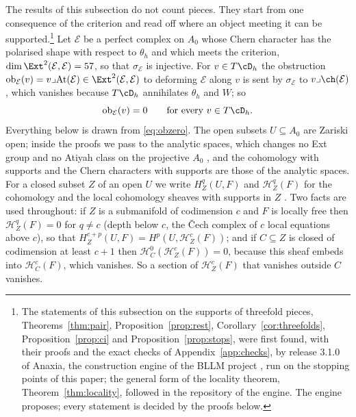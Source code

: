 The results of this subsection do not count pieces. They start from one consequence of the criterion and read off where an object meeting it can be supported.\footnote{The statements of this subsection on the supports of threefold pieces, Theorems~\ref{thm:pair}, Proposition~\ref{prop:rest}, Corollary~\ref{cor:threefolds}, Proposition~\ref{prop:ci} and Proposition~\ref{prop:stops}, were first found, with their proofs and the exact checks of Appendix~\ref{app:checks}, by release 3.1.0 of Anaxia, the construction engine of the BLLM project \cite{Bha26bllmb}, run on the stopping points of this paper; the general form of the locality theorem, Theorem~\ref{thm:locality}, followed in the repository of the engine. The engine proposes; every statement is decided by the proofs below.} Let $\mathcal{E}$ be a perfect complex on $A_{0}$ whose Chern character has the polarised shape with respect to $\theta_{h}$ and which meets the criterion, $\dim\Ext^{2}(\mathcal{E},\mathcal{E})=57$, so that $\sigma_{\mathcal{E}}$ is injective. For $v\in T\cD_{h}$ the obstruction $\mathrm{ob}_{\mathcal{E}}(v)=v\lrcorner\mathrm{At}(\mathcal{E})\in\Ext^{2}(\mathcal{E},\mathcal{E})$ to deforming $\mathcal{E}$ along $v$ is sent by $\sigma_{\mathcal{E}}$ to $v\lrcorner\ch(\mathcal{E})$ \cite{BF03}, which vanishes because $T\cD_{h}$ annihilates $\theta_{h}$ and $W$; so
\begin{equation}\label{eq:obzero}
\mathrm{ob}_{\mathcal{E}}(v)=0\qquad\text{for every }v\in T\cD_{h}.
\end{equation}
Everything below is drawn from \eqref{eq:obzero}. The open subsets $U\subseteq A_{0}$ are Zariski open; inside the proofs we pass to the analytic spaces, which changes no Ext group and no Atiyah class on the projective $A_{0}$ \cite{Ser56}, and the cohomology with supports and the Chern characters with supports are those of the analytic spaces. For a closed subset $Z$ of an open $U$ we write $H^{q}_{Z}(U,F)$ and $\mathcal{H}^{q}_{Z}(F)$ for the cohomology and the local cohomology sheaves with supports in $Z$ \cite{Har67}. Two facts are used throughout: if $Z$ is a submanifold of codimension $c$ and $F$ is locally free then $\mathcal{H}^{q}_{Z}(F)=0$ for $q\ne c$ (depth below $c$, the \v{C}ech complex of $c$ local equations above $c$), so that $H^{c+p}_{Z}(U,F)=H^{p}(U,\mathcal{H}^{c}_{Z}(F))$; and if $C\subseteq Z$ is closed of codimension at least $c+1$ then $\mathcal{H}^{0}_{C}(\mathcal{H}^{c}_{Z}(F))=0$, because this sheaf embeds into $\mathcal{H}^{c}_{C}(F)$, which vanishes. So a section of $\mathcal{H}^{c}_{Z}(F)$ that vanishes outside $C$ vanishes.

